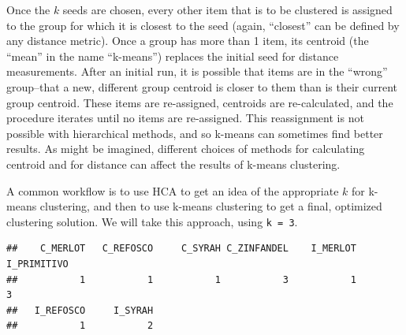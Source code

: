 \documentclass[
]{book}
\newenvironment{Shaded}{\begin{snugshade}}{\end{snugshade}}
\newcommand{\AttributeTok}[1]{\textcolor[rgb]{0.13,0.29,0.53}{#1}}
\newcommand{\DecValTok}[1]{\textcolor[rgb]{0.00,0.00,0.81}{#1}}
\newcommand{\FunctionTok}[1]{\textcolor[rgb]{0.13,0.29,0.53}{\textbf{#1}}}
\newcommand{\NormalTok}[1]{#1}
\newcommand{\OtherTok}[1]{\textcolor[rgb]{0.56,0.35,0.01}{#1}}
\newcommand{\SpecialCharTok}[1]{\textcolor[rgb]{0.81,0.36,0.00}{\textbf{#1}}}
\newcommand{\StringTok}[1]{\textcolor[rgb]{0.31,0.60,0.02}{#1}}
\begin{document}
Once the \(k\) seeds are chosen, every other item that is to be clustered is assigned to the group for which it is closest to the seed (again, ``closest'' can be defined by any distance metric). Once a group has more than 1 item, its centroid (the ``mean'' in the name ``k-means'') replaces the initial seed for distance measurements. After an initial run, it is possible that items are in the ``wrong'' group--that a new, different group centroid is closer to them than is their current group centroid. These items are re-assigned, centroids are re-calculated, and the procedure iterates until no items are re-assigned. This reassignment is not possible with hierarchical methods, and so k-means can sometimes find better results. As might be imagined, different choices of methods for calculating centroid and for distance can affect the results of k-means clustering.

A common workflow is to use HCA to get an idea of the appropriate \(k\) for k-means clustering, and then to use k-means clustering to get a final, optimized clustering solution. We will take this approach, using \texttt{k\ =\ 3}.

\begin{Shaded}
\end{Shaded}

\begin{verbatim}
##    C_MERLOT   C_REFOSCO     C_SYRAH C_ZINFANDEL    I_MERLOT I_PRIMITIVO 
##           1           1           1           3           1           3 
##   I_REFOSCO     I_SYRAH 
##           1           2
\end{verbatim}

\begin{Shaded}
\end{Shaded}
\end{document}
